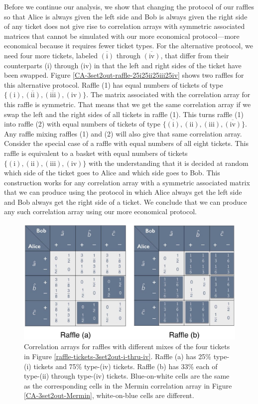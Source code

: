 Before we continue our analysis, we show that changing the protocol of our raffles so that Alice is always given the left side and Bob is always given the right side of any ticket does not give rise to correlation arrays with symmetric associated matrices that cannot be simulated with our more economical protocol---more economical because it requires fewer ticket types. For the alternative protocol, we need four more tickets, labeled $\overline{(\mathrm{i})}$ through $\overline{(\mathrm{iv})}$, that differ from their counterparts (i) through (iv) in that the left and right sides of the ticket have been swapped. Figure \ref{CA-3set2out-raffle-25i25ii25iii25iv} shows two raffles for this alternative protocol. Raffle (1) has equal numbers of tickets of type $\big\{ \mathrm{(i)}, \overline{(\mathrm{ii})}, \overline{(\mathrm{iii})}, \mathrm{(iv)} \big\}$. The matrix associated with the correlation array for this raffle is symmetric. That means that we get the same correlation array if we swap the left and the right sides of all tickets in raffle (1). This turns raffle (1) into raffle (2) with equal numbers of tickets of type $\big\{ \overline{(\mathrm{i})}, \mathrm{(ii)}, \mathrm{(iii)}, \overline{(\mathrm{iv})} \big\}$.  Any raffle mixing raffles (1) and (2) will also give that same correlation array. Consider the special case of a raffle with equal numbers of all eight tickets. This raffle is equivalent to a basket with equal numbers of tickets $\big\{  \mathrm{(i)},  \mathrm{(ii)},  \mathrm{(iii)},  \mathrm{(iv)} \big\}$ with the understanding that it is decided at random which side of the ticket goes to Alice and which side goes to Bob. This construction works for any correlation array with a symmetric associated matrix that we can produce using the protocol in which Alice always get the left side and Bob always get the right side of a ticket. We conclude that we can produce any such correlation array using our more economical protocol. 

\begin{figure}[ht]
 \centering
   \includegraphics[width=4.5in]{CA-3set2out-raffle-mix.jpeg} 
   \caption{Correlation arrays for raffles with different mixes of the four tickets in Figure \ref{raffle-tickets-3set2out-i-thru-iv}. Raffle (a) has 25\%  type-(i) tickets and 75\% type-(iv) tickets. Raffle (b) has 33\% each of type-(ii) through type-(iv) tickets. Blue-on-white cells are the same as the corresponding cells in the Mermin correlation array in Figure \ref{CA-3set2out-Mermin}, white-on-blue cells are different.}
   \label{CA-3set2out-raffle-mix}
\end{figure}

